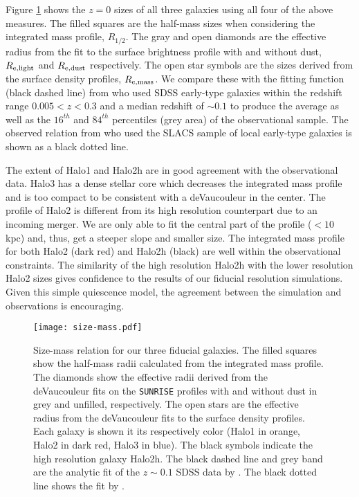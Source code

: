 \documentclass[useAMS,usenatbib]{mnras}
\begin{document}
{Figure \ref{fig:size} shows the  $z=0$ sizes of all three galaxies
using all four of the above measures.  The filled squares are the half-mass
sizes when considering the integrated mass profile, $R_{1/2}$.  The gray and open diamonds
are the effective radius from the fit to the surface brightness
profile with and without dust, $R_{\rm e, light}$ and $R_{\rm e, dust}$ respectively. The open star symbols are
the sizes derived from the surface density profiles, $R_{\rm e, mass}$.} We compare
these with the fitting function (black dashed line) from
\citet{Dutton2013} who used SDSS early-type galaxies within the
redshift range $0.005 < z < 0.3$ and a median redshift of $\sim 0.1$
to produce the average as well as the $16^{th}$ and $84^{th}$
percentiles (grey area) of the observational sample. {The observed
relation from \citet{Nipoti2009} who used the SLACS sample of local
early-type galaxies is shown as a black dotted line.}

{The extent of Halo1 and Halo2h are in good agreement with
the observational data. 
Halo3 has a dense stellar core which decreases the integrated mass
profile and is too compact to be consistent with a deVaucouleur in the center.
The profile of Halo2 is different from its high resolution counterpart
due to an incoming merger. We are only able to fit the central part of
the profile ($<10\,$kpc) and, thus, get a steeper slope and smaller
size. The integrated mass profile for both Halo2 (dark red) and Halo2h
(black) are
well within the observational constraints. The similarity of the high
resolution Halo2h with the lower resolution Halo2
sizes gives confidence to the results of our fiducial resolution
simulations. Given
this simple quiescence model, the agreement between the simulation and
observations is encouraging.}

\begin{figure}
  \centering
 \texttt{[image: size-mass.pdf]}
 \caption{Size-mass relation for our three fiducial galaxies. The
   filled squares show the half-mass radii calculated from the
   integrated mass profile. The diamonds
 show the effective radii derived from the deVaucouleur fits on the
 \texttt{SUNRISE} profiles with and without dust in grey and unfilled,
 respectively. The open stars are the effective radius from the
 deVaucouleur fits to the surface density profiles. Each galaxy is shown it its respectively color (Halo1 in orange, Halo2 in dark red,
 Halo3 in blue). The black symbols indicate
the high resolution galaxy Halo2h. The black dashed line
and grey band are the analytic fit of the $z\sim0.1$ SDSS data by
\citet{Dutton2013}. The black dotted line shows the fit by \citet{Nipoti2009}.}
  \label{fig:size}
\end{figure}
\end{document}

